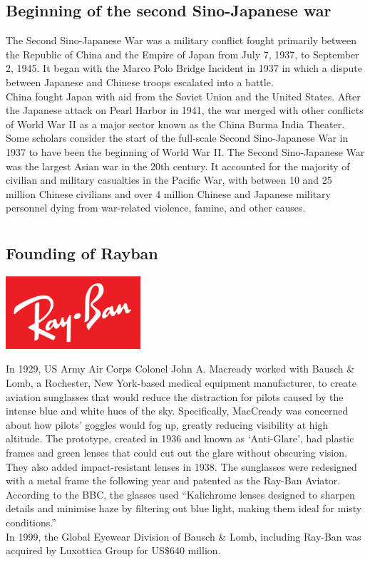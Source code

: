 \documentclass[11pt]{report}
\begin{document}
\subsection{Beginning of the second Sino-Japanese war}
The Second Sino-Japanese War was a military conflict fought primarily between the Republic of China and the Empire of Japan from July 7, 1937, to September 2, 1945. It began with the Marco Polo Bridge Incident in 1937 in which a dispute between Japanese and Chinese troops escalated into a battle.\\
\indent China fought Japan with aid from the Soviet Union and the United States. After the Japanese attack on Pearl Harbor in 1941, the war merged with other conflicts of World War II as a major sector known as the China Burma India Theater. Some scholars consider the start of the full-scale Second Sino-Japanese War in 1937 to have been the beginning of World War II. The Second Sino-Japanese War was the largest Asian war in the 20th century. It accounted for the majority of civilian and military casualties in the Pacific War, with between 10 and 25 million Chinese civilians and over 4 million Chinese and Japanese military personnel dying from war-related violence, famine, and other causes.
\section{}
\subsection{Founding of Rayban}
\vspace{2mm}\begin{center}\includegraphics[width=5cm]{./img/raybanLogo.jpg}\end{center}
In 1929, US Army Air Corps Colonel John A. Macready worked with Bausch \& Lomb, a Rochester, New York-based medical equipment manufacturer, to create aviation sunglasses that would reduce the distraction for pilots caused by the intense blue and white hues of the sky. Specifically, MacCready was concerned about how pilots' goggles would fog up, greatly reducing visibility at high altitude. The prototype, created in 1936 and known as ‘Anti-Glare’, had plastic frames and green lenses that could cut out the glare without obscuring vision. They also added impact-resistant lenses in 1938. The sunglasses were redesigned with a metal frame the following year and patented as the Ray-Ban Aviator. According to the BBC, the glasses used “Kalichrome lenses designed to sharpen details and minimise haze by filtering out blue light, making them ideal for misty conditions.”\\
\indent In 1999, the Global Eyewear Division of Bausch \& Lomb, including Ray-Ban was acquired by Luxottica Group for US\$640 million.
\end{document}
